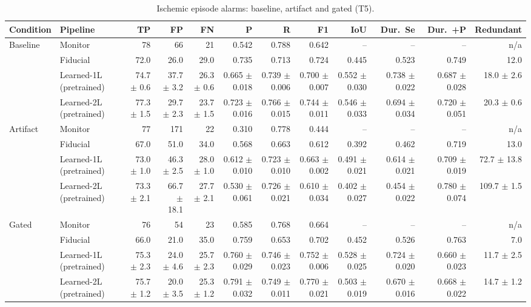 \begin{table}[htbp]
\centering
\small
\caption{Ischemic episode alarms: baseline, artifact and gated (T5).}
\label{tab:t5_alarms}
\begin{tabular}{llrrrrrrrrrr}
\toprule
Condition & Pipeline & TP & FP & FN & P & R & F1 & IoU & Dur.\ Se & Dur.\ +P & Redundant \\
\midrule
Baseline & Monitor & 78 & 66 & 21 & 0.542 & 0.788 & 0.642 & -- & -- & -- & n/a \\
 & Fiducial & 72.0 & 26.0 & 29.0 & 0.735 & 0.713 & 0.724 & 0.445 & 0.523 & 0.749 & 12.0 \\
 & Learned-1L (pretrained) & 74.7 $\pm$ 0.6 & 37.7 $\pm$ 3.2 & 26.3 $\pm$ 0.6 & 0.665 $\pm$ 0.018 & 0.739 $\pm$ 0.006 & 0.700 $\pm$ 0.007 & 0.552 $\pm$ 0.030 & 0.738 $\pm$ 0.022 & 0.687 $\pm$ 0.028 & 18.0 $\pm$ 2.6 \\
 & Learned-2L (pretrained) & 77.3 $\pm$ 1.5 & 29.7 $\pm$ 2.3 & 23.7 $\pm$ 1.5 & 0.723 $\pm$ 0.016 & 0.766 $\pm$ 0.015 & 0.744 $\pm$ 0.011 & 0.546 $\pm$ 0.033 & 0.694 $\pm$ 0.034 & 0.720 $\pm$ 0.051 & 20.3 $\pm$ 0.6 \\
\midrule
Artifact & Monitor & 77 & 171 & 22 & 0.310 & 0.778 & 0.444 & -- & -- & -- & n/a \\
 & Fiducial & 67.0 & 51.0 & 34.0 & 0.568 & 0.663 & 0.612 & 0.392 & 0.462 & 0.719 & 13.0 \\
 & Learned-1L (pretrained) & 73.0 $\pm$ 1.0 & 46.3 $\pm$ 2.5 & 28.0 $\pm$ 1.0 & 0.612 $\pm$ 0.010 & 0.723 $\pm$ 0.010 & 0.663 $\pm$ 0.002 & 0.491 $\pm$ 0.021 & 0.614 $\pm$ 0.021 & 0.709 $\pm$ 0.019 & 72.7 $\pm$ 13.8 \\
 & Learned-2L (pretrained) & 73.3 $\pm$ 2.1 & 66.7 $\pm$ 18.1 & 27.7 $\pm$ 2.1 & 0.530 $\pm$ 0.061 & 0.726 $\pm$ 0.021 & 0.610 $\pm$ 0.034 & 0.402 $\pm$ 0.027 & 0.454 $\pm$ 0.022 & 0.780 $\pm$ 0.074 & 109.7 $\pm$ 1.5 \\
\midrule
Gated & Monitor & 76 & 54 & 23 & 0.585 & 0.768 & 0.664 & -- & -- & -- & n/a \\
 & Fiducial & 66.0 & 21.0 & 35.0 & 0.759 & 0.653 & 0.702 & 0.452 & 0.526 & 0.763 & 7.0 \\
 & Learned-1L (pretrained) & 75.3 $\pm$ 2.3 & 24.0 $\pm$ 4.6 & 25.7 $\pm$ 2.3 & 0.760 $\pm$ 0.029 & 0.746 $\pm$ 0.023 & 0.752 $\pm$ 0.006 & 0.528 $\pm$ 0.025 & 0.724 $\pm$ 0.020 & 0.660 $\pm$ 0.023 & 11.7 $\pm$ 2.5 \\
 & Learned-2L (pretrained) & 75.7 $\pm$ 1.2 & 20.0 $\pm$ 3.5 & 25.3 $\pm$ 1.2 & 0.791 $\pm$ 0.032 & 0.749 $\pm$ 0.011 & 0.770 $\pm$ 0.021 & 0.503 $\pm$ 0.019 & 0.670 $\pm$ 0.016 & 0.668 $\pm$ 0.022 & 14.7 $\pm$ 1.2 \\
\bottomrule
\end{tabular}


\end{table}
